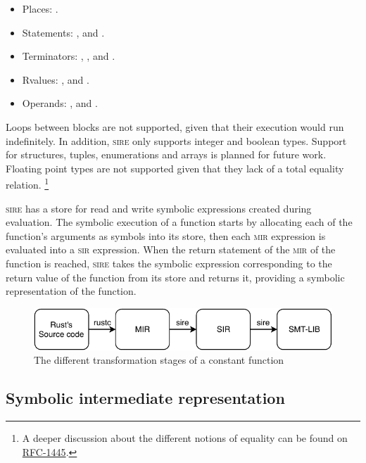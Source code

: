 \begin{itemize}
    \item Places: .
    \item Statements: ,  and .
    \item Terminators: , ,  and .
    \item Rvalues: ,  and .
    \item Operands: ,  and .
\end{itemize}
Loops between blocks are not supported, given that their execution would run
indefinitely. In addition, \textsc{sire} only supports integer and boolean
types. Support for structures, tuples, enumerations and arrays is planned for
future work.  Floating point types are not supported given that they lack of a
total equality relation. \footnote{A deeper discussion about the different notions of equality
can be found on
\href{https://github.com/rust-lang/rfcs/blob/master/text/1445-restrict-constants-in-patterns.md}{RFC-1445}.}

\textsc{sire} has a store for read and write symbolic expressions created
during evaluation. The symbolic execution of a function starts by allocating
each of the function's arguments as symbols into its store, then each
\textsc{mir} expression is evaluated into a \textsc{sir} expression. When the
return statement of the \textsc{mir} of the function is reached, \textsc{sire}
takes the symbolic expression corresponding to the return value of the function
from its store and returns it, providing a symbolic representation of the
function. 

\begin{figure}[h]
    \centering
    \includegraphics[width=15cm]{images/flow.pdf}
    \caption{The different transformation stages of a constant function}
    \label{fig:flow}
\end{figure}


\subsection{Symbolic intermediate representation}

